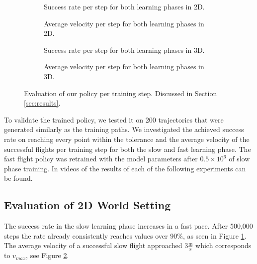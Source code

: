 \begin{figure*}[t]
    \centering
    \begin{subfigure}[htb!]{0.22\textwidth}
        
        \caption{Success rate per step for both learning phases in 2D.}
        \label{fig:2D_success_rate}
    \end{subfigure}
    \hfill  
    \begin{subfigure}[htb!]{0.22\textwidth}
        
        \caption{Average velocity per step for both learning phases in 2D.}
        \label{fig:2D_velocity}
    \end{subfigure}
    \hfill
    \begin{subfigure}[htb!]{0.22\textwidth}
        
        \caption{Success rate per step for both learning phases in 3D.}
        \label{fig:3D_success_rate}
    \end{subfigure}
    \hfill  
    \begin{subfigure}[htb!]{0.22\textwidth}
        
        \caption{Average velocity per step for both learning phases in 3D.}
        \label{fig:3D_velocity}
    \end{subfigure}
    
    \caption{Evaluation of our policy per training step. Discussed in Section \ref{sec:results}.}
    \label{fig:results}
\end{figure*}

To validate the trained policy, we tested it on 200 trajectories that were generated similarly as the training paths. We investigated the achieved success rate on reaching every point within the tolerance and the average velocity of the successful flights per training step for both the slow and fast learning phase. The fast flight policy was retrained with the model parameters after $0.5 \times 10^6$ of slow phase training. In \cite{videos} videos of the results of each of the following experiments can be found.

\subsection{Evaluation of 2D World Setting}
The success rate in the slow learning phase increases in a fast pace. After 500,000 steps the rate already consistently reaches values over 90\%, as seen in Figure \ref{fig:2D_success_rate}. The average velocity of a successful slow flight approached $3\frac{\text{m}}{\text{s}}$ which corresponds to $v_{max}$, see Figure \ref{fig:2D_velocity}.

